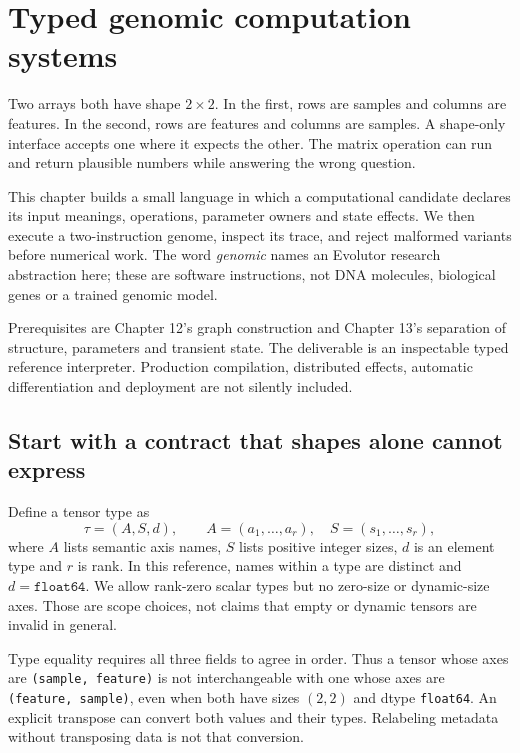 \chapter{Typed genomic computation systems}
Two arrays both have shape $2\times2$. In the first, rows are samples and
columns are features. In the second, rows are features and columns are
samples. A shape-only interface accepts one where it expects the other.
The matrix operation can run and return plausible numbers while answering
the wrong question.

This chapter builds a small language in which a computational candidate
declares its input meanings, operations, parameter owners and state effects.
We then execute a two-instruction genome, inspect its trace, and reject
malformed variants before numerical work. The word \emph{genomic} names
an Evolutor research abstraction here; these are software instructions,
not DNA molecules, biological genes or a trained genomic model.

Prerequisites are Chapter 12's graph construction and Chapter 13's
separation of structure, parameters and transient state. The deliverable is
an inspectable typed reference interpreter. Production compilation,
distributed effects, automatic differentiation and deployment are not
silently included.

\section{Start with a contract that shapes alone cannot express}
Define a tensor type as
\begin{equation}
 \tau=(A,S,d),
 \qquad A=(a_1,\ldots,a_r),\quad S=(s_1,\ldots,s_r),
 \label{eq:type}
\end{equation}
where $A$ lists semantic axis names, $S$ lists positive integer sizes,
$d$ is an element type and $r$ is rank. In this reference, names within a
type are distinct and $d=\texttt{float64}$. We allow rank-zero scalar types
but no zero-size or dynamic-size axes. Those are scope choices, not claims
that empty or dynamic tensors are invalid in general.

Type equality requires all three fields to agree in order. Thus a tensor
whose axes are \texttt{(sample, feature)} is not interchangeable with one
whose axes are \texttt{(feature, sample)}, even when both have sizes
$(2,2)$ and dtype \texttt{float64}.
An explicit transpose can convert both values and their types.
Relabeling metadata without transposing data is not that conversion.

